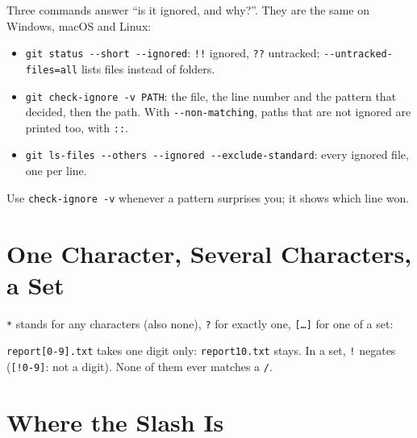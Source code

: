 \documentclass[11pt,a4paper]{article}
\begin{document}
Three commands answer ``is it ignored, and why?''. They are the same on Windows, macOS and Linux:


\begin{itemize}
  \item \texttt{git status -{}-short -{}-ignored}: \texttt{!!} ignored, \texttt{??} untracked; \texttt{-{}-untracked-files=all} lists files instead of folders.
  \item \texttt{git check-ignore -v PATH}: the file, the line number and the pattern that decided, then the path.
  With \texttt{-{}-non-matching}, paths that are not ignored are printed too, with \texttt{::}.
  \item \texttt{git ls-files -{}-others -{}-ignored -{}-exclude-standard}: every ignored file, one per line.
\end{itemize}
Use \texttt{check-ignore -v} whenever a pattern surprises you; it shows which line won.



\section{One Character, Several Characters, a Set}


\texttt{*} stands for any characters (also none), \texttt{?} for exactly one, \texttt{[\dots]} for one of a set:

\noindent
\begin{minipage}[t]{0.49\linewidth}

\end{minipage}\hfill
\begin{minipage}[t]{0.49\linewidth}

\end{minipage}

\texttt{report[0-9].txt} takes one digit only: \texttt{report10.txt} stays. In a set, \texttt{!} negates
(\texttt{[!0-9]}: not a digit). None of them ever matches a \texttt{/}.



\section{Where the Slash Is}
\label{sec:slash}
\end{document}
